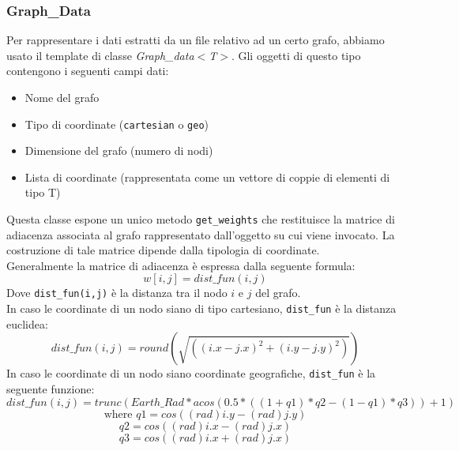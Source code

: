 \documentclass[]{article}
\begin{document}
\subsubsection{Graph\_Data}
Per rappresentare i dati estratti da un file relativo ad un certo grafo, abbiamo usato il template di classe \textit{Graph\_data$<$T$>$}. Gli oggetti di questo tipo contengono i seguenti campi dati:
\begin{itemize}
	\item Nome del grafo
	\item Tipo di coordinate (\verb|cartesian| o \verb|geo|)
	\item Dimensione del grafo (numero di nodi)
	\item Lista di coordinate (rappresentata come un vettore di coppie di elementi di tipo T)
\end{itemize}
Questa classe espone un unico metodo \verb|get_weights| che restituisce la matrice di adiacenza associata al grafo rappresentato dall'oggetto su cui viene invocato. La costruzione di tale matrice dipende dalla tipologia di coordinate.\\
Generalmente la matrice di adiacenza è espressa dalla seguente formula:
$$w[i,j]=dist\_fun(i, j)$$
Dove \verb|dist_fun(i,j)| è la distanza tra il nodo $i$ e $j$ del grafo.\\
In caso le coordinate di un nodo siano di tipo cartesiano, \verb|dist_fun| è la distanza euclidea:
$$dist\_fun(i,j)=round(\sqrt{((i.x - j.x)^2 + (i.y - j.y)^2)})$$
In caso le coordinate di un nodo siano coordinate geografiche, \verb|dist_fun| è la seguente funzione:
$$dist\_fun(i,j) = trunc(Earth\_Rad * acos(0.5*((1+q1)*q2-(1-q1)*q3))+1)$$
$$\text{where } q1 = cos((rad)i.y - (rad)j.y)$$
$$q2 = cos((rad)i.x - (rad)j.x)$$
$$q3 = cos((rad)i.x + (rad)j.x)$$
\end{document}
